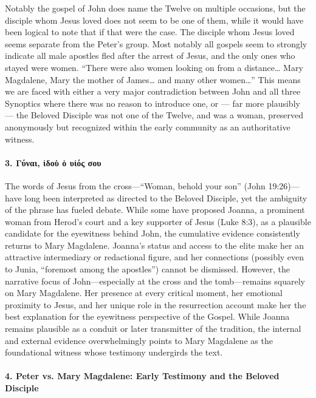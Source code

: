 Notably the gospel of John does name the Twelve on multiple occasions, but the disciple whom Jesus loved does not seem to be one of them, while it would have been logical to note that if that were the case.
The disciple whom Jesus loved seems separate from the Peter's group.
Most notably all gospels seem to strongly indicate all male apostles fled after the arrest of Jesus, and the only ones who stayed were women.
``There were also women looking on from a distance\ldots{} Mary Magdalene, Mary the mother of James\ldots{} and many other women\ldots'' This means we are faced with either a very major contradiction between John and all three Synoptics where there was no reason to introduce one, or --- far more plausibly --- the Beloved Disciple was not one of the Twelve, and was a woman, preserved anonymously but recognized within the early community as an authoritative witness.

\paragraph{3.
Γύναι, ἰδοὺ ὁ υἱός σου}\label{par:ux3b3ux3cdux3b9-ux1f30ux3b4ux3bfux1f7a-ux1f41-ux3c5ux1f31ux3ccux3c2-ux3c3ux3bfux3c5}

The words of Jesus from the cross—“Woman, behold your son” (John 19:26)—have long been interpreted as directed to the Beloved Disciple, yet the ambiguity of the phrase has fueled debate. While some have proposed Joanna, a prominent woman from Herod’s court and a key supporter of Jesus (Luke 8:3), as a plausible candidate for the eyewitness behind John, the cumulative evidence consistently returns to Mary Magdalene. Joanna’s status and access to the elite make her an attractive intermediary or redactional figure, and her connections (possibly even to Junia, “foremost among the apostles”) cannot be dismissed. However, the narrative focus of John—especially at the cross and the tomb—remains squarely on Mary Magdalene. Her presence at every critical moment, her emotional proximity to Jesus, and her unique role in the resurrection account make her the best explanation for the eyewitness perspective of the Gospel. While Joanna remains plausible as a conduit or later transmitter of the tradition, the internal and external evidence overwhelmingly points to Mary Magdalene as the foundational witness whose testimony undergirds the text.

\paragraph{4.
Peter vs. Mary Magdalene: Early Testimony and the Beloved Disciple}\label{par:when-the-authors-of-the-apocryphal-gospel-of-mary-or-other-early-texts-try-to-argue-who-the-beloved-disciple-is-they-argue-that-it-is-mary-magdalene-rather-than-peter.}

